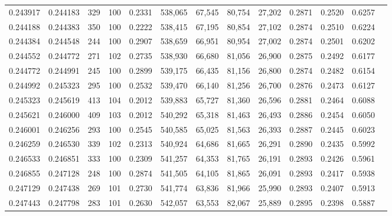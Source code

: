 \begin{tabular}{rrrrrrrrrrrrr}
0.243917 & 0.244183 &   329 & 100 &                                     0.2331 & 538,065 &  67,545 &  80,754 &  27,202 & 0.2871 & 0.2520 & 0.6257 \\
0.244188 & 0.244383 &   350 & 100 &                                     0.2222 & 538,415 &  67,195 &  80,854 &  27,102 & 0.2874 & 0.2510 & 0.6224 \\
0.244384 & 0.244548 &   244 & 100 &                                     0.2907 & 538,659 &  66,951 &  80,954 &  27,002 & 0.2874 & 0.2501 & 0.6202 \\
0.244552 & 0.244772 &   271 & 102 &                                     0.2735 & 538,930 &  66,680 &  81,056 &  26,900 & 0.2875 & 0.2492 & 0.6177 \\
0.244772 & 0.244991 &   245 & 100 &                                     0.2899 & 539,175 &  66,435 &  81,156 &  26,800 & 0.2874 & 0.2482 & 0.6154 \\
0.244992 & 0.245323 &   295 & 100 &                                     0.2532 & 539,470 &  66,140 &  81,256 &  26,700 & 0.2876 & 0.2473 & 0.6127 \\
0.245323 & 0.245619 &   413 & 104 &                                     0.2012 & 539,883 &  65,727 &  81,360 &  26,596 & 0.2881 & 0.2464 & 0.6088 \\
0.245621 & 0.246000 &   409 & 103 &                                     0.2012 & 540,292 &  65,318 &  81,463 &  26,493 & 0.2886 & 0.2454 & 0.6050 \\
0.246001 & 0.246256 &   293 & 100 &                                     0.2545 & 540,585 &  65,025 &  81,563 &  26,393 & 0.2887 & 0.2445 & 0.6023 \\
0.246259 & 0.246530 &   339 & 102 &                                     0.2313 & 540,924 &  64,686 &  81,665 &  26,291 & 0.2890 & 0.2435 & 0.5992 \\
0.246533 & 0.246851 &   333 & 100 &                                     0.2309 & 541,257 &  64,353 &  81,765 &  26,191 & 0.2893 & 0.2426 & 0.5961 \\
0.246855 & 0.247128 &   248 & 100 &                                     0.2874 & 541,505 &  64,105 &  81,865 &  26,091 & 0.2893 & 0.2417 & 0.5938 \\
0.247129 & 0.247438 &   269 & 101 &                                     0.2730 & 541,774 &  63,836 &  81,966 &  25,990 & 0.2893 & 0.2407 & 0.5913 \\
0.247443 & 0.247798 &   283 & 101 &                                     0.2630 & 542,057 &  63,553 &  82,067 &  25,889 & 0.2895 & 0.2398 & 0.5887 \\

\end{tabular}
